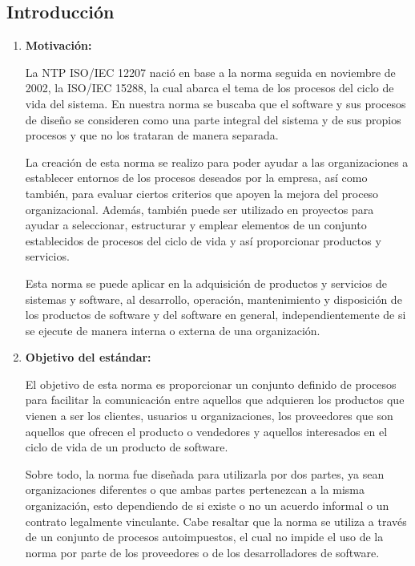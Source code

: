\documentclass{article}
\begin{document}
\subsection{Introducción}

\begin{enumerate}
    \item \textbf{Motivación:}

    La \nocite{ISO12207} NTP ISO/IEC 12207 nació en base a la norma seguida en noviembre de
    2002, la ISO/IEC 15288, la cual abarca el tema de los procesos del ciclo de
    vida del sistema. En nuestra norma se buscaba que el software y sus procesos
    de diseño se consideren como una parte integral del sistema y de sus propios
    procesos y que no los trataran de manera separada.

    La creación de esta norma se realizo para poder ayudar a las
    organizaciones a establecer entornos de los procesos deseados por la empresa,
    así como también, para evaluar ciertos criterios que apoyen la mejora del
    proceso organizacional. Además, también puede ser utilizado en proyectos
    para ayudar a seleccionar, estructurar y emplear elementos de un conjunto
    establecidos de procesos del ciclo de vida y así proporcionar productos y
    servicios.

    Esta norma se puede aplicar en la adquisición de productos y servicios
    de sistemas y software, al desarrollo, operación, mantenimiento y
    disposición de los productos de software y del software en general,
    independientemente de si se ejecute de manera interna o externa de una
    organización.

    \item \textbf{Objetivo del estándar:}
    
    El objetivo de esta norma es proporcionar un conjunto definido de
    procesos para facilitar la comunicación entre aquellos que adquieren los
    productos que vienen a ser los clientes, usuarios u organizaciones, los
    proveedores que son aquellos que ofrecen el producto o vendedores y
    aquellos interesados en el ciclo de vida de un producto de software.

    Sobre todo, la norma fue diseñada para utilizarla por dos partes, ya
    sean organizaciones diferentes o que ambas partes pertenezcan a la misma
    organización, esto dependiendo de si existe o no un acuerdo informal o un
    contrato legalmente vinculante. Cabe resaltar que la norma se utiliza a
    través de un conjunto de procesos autoimpuestos, el cual no impide el uso de
    la norma por parte de los proveedores o de los desarrolladores de software.

\end{enumerate}
\end{document}
